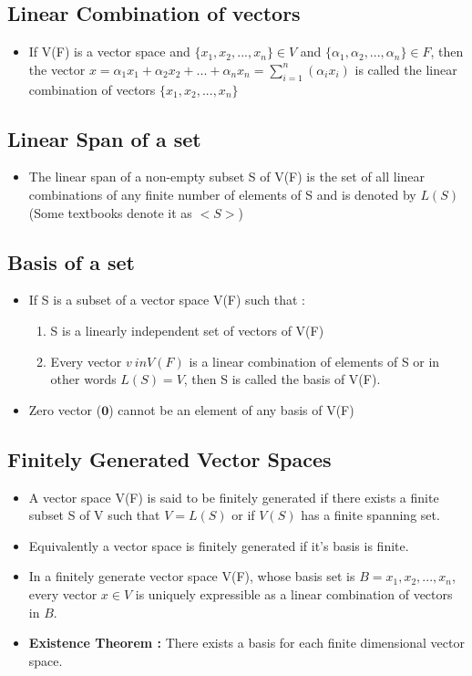 \documentclass[twoside]{article}
\begin{document}
	\subsection{Linear Combination of vectors}
	\begin{itemize}
		\item If V(F) is a vector space and $\{x_1, x_2, ..., x_n \} \in V$ and $\{\alpha_1, \alpha_2, ..., \alpha_n\} \in F$, then the vector $x = \alpha_1 x_1 + \alpha_2 x_2 + ... + \alpha_n x_n = \sum_{i=1}^{n}(\alpha_i x_i)$ is called the linear combination of vectors $\{x_1, x_2, ..., x_n\}$
	\end{itemize}
	\subsection{Linear Span of a set}
	\begin{itemize}
		\item The linear span of a non-empty subset S of V(F) is the set of all linear combinations of any finite number of elements of S and is denoted by $L(S)$ (Some textbooks denote it as $<S>$)
	\end{itemize}
	\subsection{Basis of a set}
	\begin{itemize}
		\item If S is a subset of a vector space V(F) such that :
		\begin{enumerate}
			\item S is a linearly independent set of vectors of V(F)
			\item Every vector $v\ in V(F)$ is a linear combination of elements of S or in other words $L(S) = V$, then S is called the basis of V(F).
		\end{enumerate}
		\item Zero vector ($\mathbf{0}$) cannot be an element of any basis of V(F)
	\end{itemize}
	\subsection{Finitely Generated Vector Spaces}
	\begin{itemize}
		\item A vector space V(F) is said to be finitely generated if there exists a finite subset S of V such that $V = L(S)$ or if $V(S)$ has a finite spanning set.
		\item Equivalently a vector space is finitely generated if it's basis is finite.
		\item In a finitely generate vector space V(F), whose basis set is $B = {x_1, x_2, ..., x_n}$, every vector $x \in V$ is uniquely expressible as a linear combination of vectors in $B$.
		\item {\bf Existence Theorem : } There exists a basis for each finite dimensional vector space.
	\end{itemize}
\end{document}
